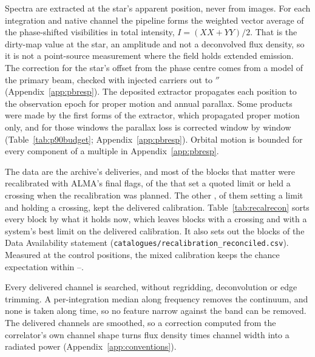 Spectra are extracted at the star's apparent position, never from images. For
each integration and native channel the pipeline forms the weighted vector
average of the phase-shifted visibilities in total intensity, $I=(XX+YY)/2$.
That is the dirty-map value at the star, an amplitude and not a deconvolved
flux density, so it is not a point-source measurement where the field holds
extended emission. The correction for the star's offset from the phase
centre comes from a model of the primary beam, checked with injected carriers
out to \OffInjMaxArcsec$''$ (Appendix~\ref{app:pbresp}).
The deposited extractor propagates each position to the observation epoch
for proper motion and annual parallax. Some products were made by the first
forms of the extractor, which propagated proper motion only, and for those
windows the parallax loss is corrected window by window
(Table~\ref{tab:p90budget}; Appendix~\ref{app:pbresp}).
Orbital motion is bounded for every component of a multiple in
Appendix~\ref{app:pbresp}.

The data are the archive's deliveries, and most of the blocks that matter
were recalibrated with ALMA's final flags, \RflNEbCore{} of the
\RflNEbCoreAll{} that set a quoted limit or held a crossing when the
recalibration was planned. The other \RflNEbNot{}, \RflNNotLim{} of them
setting a limit and \RflNNotCross{} holding a crossing, kept the delivered
calibration. Table~\ref{tab:recalrecon} sorts every block by what it holds
now, which leaves
\LrRecNCrossNotRec{} blocks with a crossing and \LrRecNBestNotRec{} with a
system's best limit on the delivered calibration. It also sets out the
\XgNBlkPlan{} blocks of the Data Availability statement
(\texttt{catalogues/\allowbreak recalibration\_reconciled.csv}). Measured at
the control positions, the mixed calibration keeps the chance expectation
within \RflCeLo--\RflCeHi.

Every delivered channel is searched, without regridding, deconvolution or
edge trimming. A per-integration median along frequency removes the
continuum, and none is taken along time, so no feature narrow against the
band can be removed. The delivered channels are smoothed, so a correction
computed from the correlator's own channel shape turns flux density times
channel width into a radiated power (Appendix~\ref{app:conventions}).

